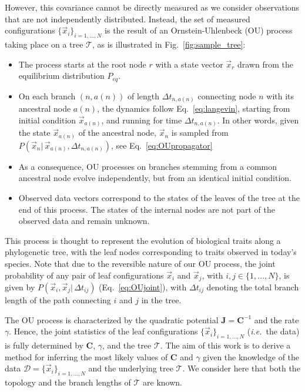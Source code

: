 \documentclass[preprint,amsmath,amssymb,superscriptaddress,showpacs,pre]{revtex4-1}
\newcommand{\ie}{\emph{i.e.}}
\def\vx{\vec x}
\begin{document}
However, this covariance cannot be directly measured as we consider observations that are not independently distributed.
Instead, the set of measured configurations $\{\vx_i\}_{i=1,...,N}$ is the result of an Ornstein-Uhlenbeck (OU) process taking place on a tree $\mathcal{T}$, as is illustrated in Fig.~\ref{fig:sample_tree}:
\begin{itemize}
    \item The process starts at the root node $r$ with a state vector $\vx_r$ drawn from the equilibrium distribution $P_{eq}$.
    \item On each branch $(n,a(n))$ of length $\Delta t_{n,a(n)}$ connecting node $n$ with its ancestral node $a(n)$, the dynamics follow Eq.~\eqref{eq:langevin}, starting from initial condition $\vx_{a(n)}$, and running for time $\Delta t_{n,a(n)}$. In other words, given the state $\vx_{a(n)}$ of the ancestral node, $\vx_n$ is sampled from $P(\vx_n |\, \vx_{a(n)}, \Delta t_{n,a(n)})$, see Eq.~\eqref{eq:OUpropagator}
    \item As a consequence, OU processes on branches stemming from a common ancestral node evolve independently, but from an identical initial condition.
    \item Observed data vectors correspond to the states of the leaves of the tree at the end of this process. The states of the internal nodes are not part of the observed data and remain unknown. 
\end{itemize}
This process is thought to represent the evolution of biological traits along a phylogenetic tree, with the leaf nodes corresponding to traits observed in today's species. Note that due to the reversible nature of our OU process, the joint probability of any pair of leaf configurations $\vx_i$ and $\vx_j$, with $i,j\in\{1,...,N\}$, is given by  $P(\vx_i,\vx_j|\,\Delta t_{ij})$ (Eq.~\eqref{eq:OUjoint}), with $\Delta t_{ij}$ denoting the total branch length of the path connecting $i$ and $j$ in the tree.

The OU process is characterized by the quadratic potential $\bm J = \bm C^{-1}$ and the rate $\gamma$. 
Hence, the joint statistics of the leaf configurations $\{\vx_i\}_{i=1,...,N}$ (\ie~the data) is fully determined by $\bm C$, $\gamma$, and the tree $\mathcal{T}$. 
The aim of this work is to derive a method for inferring the most likely values of $\bm C$ and $\gamma$ given the knowledge of the data $\mathcal{D}=\{\vx_i\}_{i=1,...,N}$ and the underlying tree $\mathcal{T}$. We consider here that both the topology and the branch lengths of $\mathcal{T}$ are known. 
\end{document}
